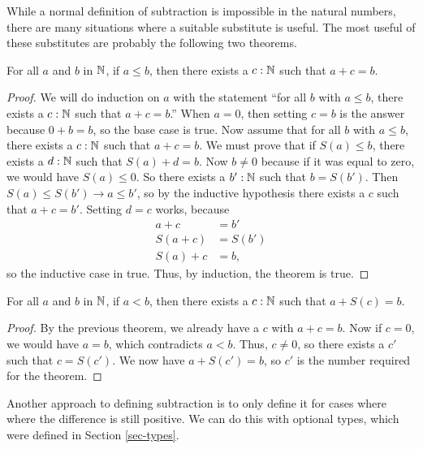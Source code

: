 \documentclass[../math.tex]{subfiles}
\begin{document}
While a normal definition of subtraction is impossible in the natural numbers,
there are many situations where a suitable substitute is useful.  The most
useful of these substitutes are probably the following two theorems.

\begin{theorem} \label{nat-le-ex}
    For all $a$ and $b$ in $\mathbb{N}$, if $a \leq b$, then there exists a $c : \mathbb{N}$
    such that $a + c = b$.
\end{theorem}
\begin{proof}
    We will do induction on $a$ with the statement ``for all $b$ with $a \leq
    b$, there exists a $c : \mathbb{N}$ such that $a + c = b$.''  When $a = 0$, then
    setting $c = b$ is the answer because $0 + b = b$, so the base case is true.
    Now assume that for all $b$ with $a \leq b$, there exists a $c : \mathbb{N}$ such
    that $a + c = b$.  We must prove that if $S(a) \leq b$, there exists a $d :
    \mathbb{N}$ such that $S(a) + d = b$.  Now $b \neq 0$ because if it was equal to
    zero, we would have $S(a) \leq 0$.  So there exists a $b' : \mathbb{N}$ such that $b
    = S(b')$.  Then $S(a) \leq S(b') \rightarrow a \leq b'$, so by the inductive
    hypothesis there exists a $c$ such that $a + c = b'$.  Setting $d = c$
    works, because
    \begin{align*}
        a + c &= b' \\
        S(a + c) &= S(b') \\
        S(a) + c &= b,
    \end{align*}
    so the inductive case in true.  Thus, by induction, the theorem is true.
\end{proof}

\begin{theorem} \label{nat-lt-ex}
    For all $a$ and $b$ in $\mathbb{N}$, if $a < b$, then there exists a $c : \mathbb{N}$
    such that $a + S(c) = b$.
\end{theorem}
\begin{proof}
    By the previous theorem, we already have a $c$ with $a + c = b$.  Now if $c
    = 0$, we would have $a = b$, which contradicts $a < b$.  Thus, $c \neq 0$,
    so there exists a $c'$ such that $c = S(c')$.  We now have $a + S(c') = b$,
    so $c'$ is the number required for the theorem.
\end{proof}

Another approach to defining subtraction is to only define it for cases where
where the difference is still positive.  We can do this with optional types,
which were defined in Section \ref{sec-types}.
\end{document}
